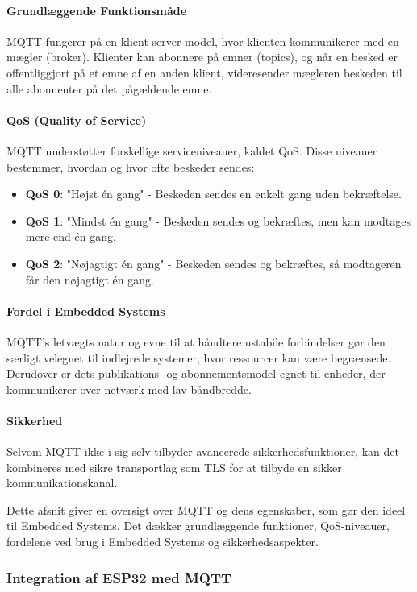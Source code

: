 \paragraph{Grundlæggende Funktionsmåde}
MQTT fungerer på en klient-server-model, hvor klienten kommunikerer med en mægler (broker). Klienter kan abonnere på emner (topics), og når en besked er offentliggjort på et emne af en anden klient, videresender mægleren beskeden til alle abonnenter på det pågældende emne.

\paragraph{QoS (Quality of Service)}
MQTT understøtter forskellige serviceniveauer, kaldet QoS. Disse niveauer bestemmer, hvordan og hvor ofte beskeder sendes:
\begin{itemize}
	\item \textbf{QoS 0}: "Højst én gang" - Beskeden sendes en enkelt gang uden bekræftelse.
	\item \textbf{QoS 1}: "Mindst én gang" - Beskeden sendes og bekræftes, men kan modtages mere end én gang.
	\item \textbf{QoS 2}: "Nøjagtigt én gang" - Beskeden sendes og bekræftes, så modtageren får den nøjagtigt én gang.
\end{itemize}

\paragraph{Fordel i Embedded Systems}
MQTT's letvægts natur og evne til at håndtere ustabile forbindelser gør den særligt velegnet til indlejrede systemer, hvor ressourcer kan være begrænsede. Derudover er dets publikations- og abonnementsmodel egnet til enheder, der kommunikerer over netværk med lav båndbredde.

\paragraph{Sikkerhed}
Selvom MQTT ikke i sig selv tilbyder avancerede sikkerhedsfunktioner, kan det kombineres med sikre transportlag som TLS for at tilbyde en sikker kommunikationskanal.

Dette afsnit giver en oversigt over MQTT og dens egenskaber, som gør den ideel til Embedded Systems. Det dækker grundlæggende funktioner, QoS-niveauer, fordelene ved brug i Embedded Systems og sikkerhedsaspekter.

\subsubsection{Integration af ESP32 med MQTT}


